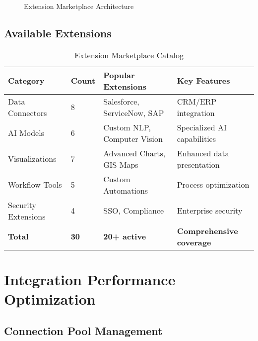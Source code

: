\begin{figure}[H]
\caption{Extension Marketplace Architecture}
\label{fig:marketplace_architecture}
\end{figure}

\subsection{Available Extensions}

\begin{table}[H]
\centering
\caption{Extension Marketplace Catalog}
\begin{tabular}{|p{3cm}|p{2cm}|p{3cm}|p{4cm}|}
\hline
\textbf{Category} & \textbf{Count} & \textbf{Popular Extensions} & \textbf{Key Features} \\
\hline
Data Connectors & 8 & Salesforce, ServiceNow, SAP & CRM/ERP integration \\
\hline
AI Models & 6 & Custom NLP, Computer Vision & Specialized AI capabilities \\
\hline
Visualizations & 7 & Advanced Charts, GIS Maps & Enhanced data presentation \\
\hline
Workflow Tools & 5 & Custom Automations & Process optimization \\
\hline
Security Extensions & 4 & SSO, Compliance & Enterprise security \\
\hline
\textbf{Total} & \textbf{30} & \textbf{20+ active} & \textbf{Comprehensive coverage} \\
\hline
\end{tabular}
\end{table}

\section{Integration Performance Optimization}

\subsection{Connection Pool Management}

